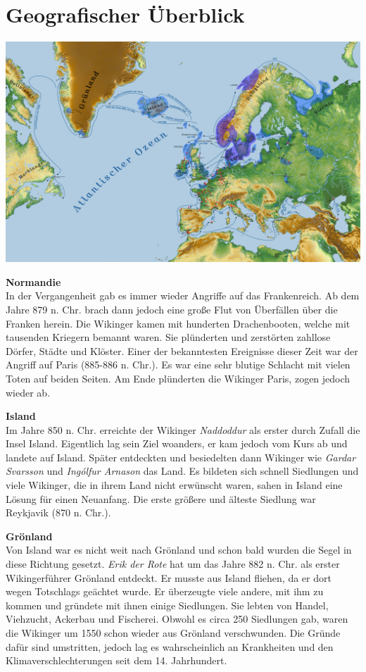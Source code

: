 \documentclass[12pt,a4paper,ngerman,openany]{book}
\begin{document}
\section{Geografischer Überblick}
\begin{center}
  \hspace*{-1.65cm}
  \includegraphics[width=0.85\paperwidth]{siedlungspunkte.png}
\end{center}

\textbf{Normandie}\\
In der Vergangenheit gab es immer wieder Angriffe auf das Frankenreich. Ab dem Jahre 879 n. Chr. brach dann jedoch eine große Flut von Überfällen über die Franken herein. Die Wikinger kamen mit hunderten Drachenbooten, welche mit tausenden Kriegern bemannt waren. Sie plünderten und zerstörten zahllose Dörfer, Städte und Klöster. Einer der bekanntesten Ereignisse dieser Zeit war der Angriff auf Paris (885-886 n. Chr.). Es war eine sehr blutige Schlacht mit vielen Toten auf beiden Seiten.
Am Ende plünderten die Wikinger Paris, zogen jedoch wieder ab.

\textbf{Island}\\
Im Jahre 850 n. Chr. erreichte der Wikinger \textit{Naddoddur} als erster durch Zufall die Insel Island. Eigentlich lag sein Ziel woanders, er kam jedoch vom Kurs ab und landete auf Island. Später entdeckten und besiedelten dann Wikinger wie \textit{Gardar Svarsson} und \textit{Ingólfur Arnason} das Land. Es bildeten sich schnell Siedlungen und viele Wikinger, die in ihrem Land nicht erwünscht waren, sahen in Island eine Lösung für einen Neuanfang. Die erste größere und älteste Siedlung war Reykjavik (870 n. Chr.).

\textbf{Grönland}\\
Von Island war es nicht weit nach Grönland und schon bald wurden die Segel in diese Richtung gesetzt. \textit{Erik der Rote} hat um das Jahre 882 n. Chr. als erster Wikingerführer Grönland entdeckt. Er musste aus Island fliehen, da er dort wegen Totschlags geächtet wurde. Er überzeugte viele andere, mit ihm zu kommen und gründete mit ihnen einige Siedlungen. Sie lebten von Handel, Viehzucht, Ackerbau und Fischerei. Obwohl es circa 250 Siedlungen gab, waren die Wikinger um 1550 schon wieder aus Grönland verschwunden. Die Gründe dafür sind umstritten, jedoch lag es wahrscheinlich an Krankheiten und den Klimaverschlechterungen seit dem 14. Jahrhundert.
\end{document}
